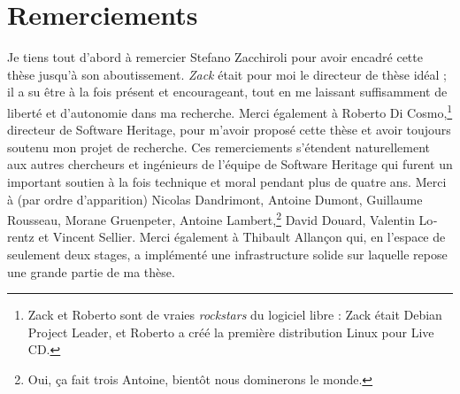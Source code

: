 \chapter*{Remerciements}

\begin{otherlanguage}{french}
\begin{SingleSpace}

  Je tiens tout d'abord à remercier Stefano Zacchiroli pour avoir encadré cette
  thèse jusqu'à son aboutissement. \emph{Zack} était pour moi le directeur de
  thèse idéal ; il a su être à la fois présent et encourageant, tout en me
  laissant suffisamment de liberté et d'autonomie dans ma recherche. Merci
  également à Roberto Di Cosmo,\footnote{Zack et Roberto sont de vraies
  \emph{rockstars} du logiciel libre : Zack était Debian Project Leader, et
  Roberto a créé la première distribution Linux pour Live CD.} directeur
  de Software Heritage, pour m'avoir proposé cette thèse et avoir toujours
  soutenu mon projet de recherche.
  Ces remerciements s'étendent
  naturellement aux autres chercheurs et ingénieurs de l'équipe de Software
  Heritage qui furent un important soutien à la fois technique et moral pendant
  plus de quatre ans. Merci à (par ordre d'apparition) Nicolas Dandrimont,
  Antoine Dumont, Guillaume Rousseau, Morane Gruenpeter, Antoine
  Lambert,\footnote{Oui, ça fait trois Antoine, bientôt nous dominerons le
  monde.} David Douard, Valentin Lorentz et Vincent Sellier. Merci également à
  Thibault Allançon qui, en l'espace de seulement deux stages, a implémenté une
  infrastructure solide sur laquelle repose une grande partie de ma thèse.


\end{SingleSpace}
\end{otherlanguage}
